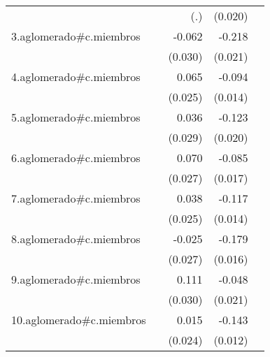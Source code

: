 {\begin{longtable}{l*{4}{D{.}{.}{-1}}}
            &                     &         (.)         &     (0.020)         &                     \\
\addlinespace
3.aglomerado#c.miembros&                     &      -0.062\sym{*}  &      -0.218\sym{***}&                     \\
            &                     &     (0.030)         &     (0.021)         &                     \\
\addlinespace
4.aglomerado#c.miembros&                     &       0.065\sym{**} &      -0.094\sym{***}&                     \\
            &                     &     (0.025)         &     (0.014)         &                     \\
\addlinespace
5.aglomerado#c.miembros&                     &       0.036         &      -0.123\sym{***}&                     \\
            &                     &     (0.029)         &     (0.020)         &                     \\
\addlinespace
6.aglomerado#c.miembros&                     &       0.070\sym{**} &      -0.085\sym{***}&                     \\
            &                     &     (0.027)         &     (0.017)         &                     \\
\addlinespace
7.aglomerado#c.miembros&                     &       0.038         &      -0.117\sym{***}&                     \\
            &                     &     (0.025)         &     (0.014)         &                     \\
\addlinespace
8.aglomerado#c.miembros&                     &      -0.025         &      -0.179\sym{***}&                     \\
            &                     &     (0.027)         &     (0.016)         &                     \\
\addlinespace
9.aglomerado#c.miembros&                     &       0.111\sym{***}&      -0.048\sym{*}  &                     \\
            &                     &     (0.030)         &     (0.021)         &                     \\
\addlinespace
10.aglomerado#c.miembros&                     &       0.015         &      -0.143\sym{***}&                     \\
            &                     &     (0.024)         &     (0.012)         &                     \\

\end{longtable}}
